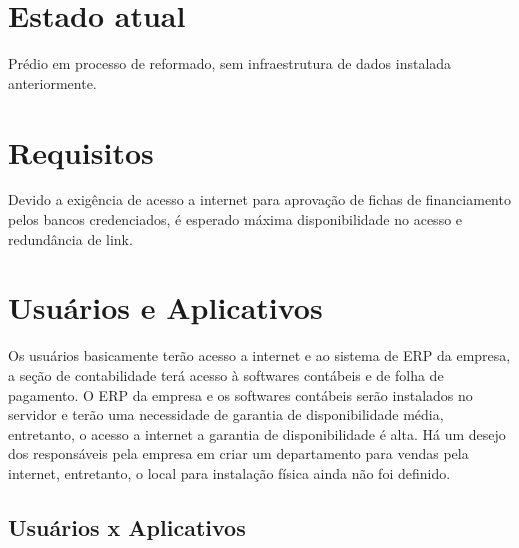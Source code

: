 \documentclass[	DIV=calc,%
							paper=a4,%
							fontsize=12pt,%
							onecolumn]{scrartcl}	 					%
\begin{document}
\section{Estado atual}
Prédio em processo de reformado, sem infraestrutura de dados instalada anteriormente.

\section{Requisitos}
Devido a exigência de acesso a internet para aprovação de fichas de financiamento pelos bancos credenciados, é esperado máxima disponibilidade no acesso e redundância de link. 

\section{Usuários e Aplicativos}
Os usuários basicamente terão acesso a internet e ao sistema de ERP da empresa, a seção de contabilidade terá acesso à softwares contábeis e de folha de pagamento. O ERP da empresa e os softwares contábeis serão instalados no servidor e terão uma necessidade de garantia de disponibilidade média, entretanto, o acesso a internet a garantia de disponibilidade é alta.  Há um desejo dos responsáveis pela empresa em criar um departamento para vendas pela internet, entretanto, o local para instalação física ainda não foi definido.

\subsection{Usuários x Aplicativos}
\end{document}
